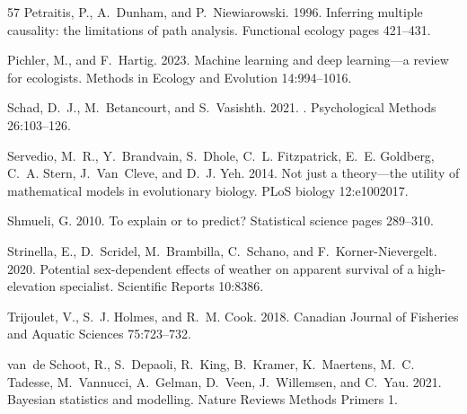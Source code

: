 \documentclass[11pt]{article}
\begin{document}
\begin{thebibliography}{57}
Petraitis, P., A.~Dunham, and P.~Niewiarowski. 1996.
\newblock Inferring multiple causality: the limitations of path analysis.
\newblock Functional ecology pages 421--431.

Pichler, M., and F.~Hartig. 2023.
\newblock Machine learning and deep learning---a review for ecologists.
\newblock Methods in Ecology and Evolution 14:994--1016.

Schad, D.~J., M.~Betancourt, and S.~Vasishth. 2021.
.
\newblock Psychological Methods 26:103--126.

Servedio, M.~R., Y.~Brandvain, S.~Dhole, C.~L. Fitzpatrick, E.~E. Goldberg,
  C.~A. Stern, J.~Van~Cleve, and D.~J. Yeh. 2014.
\newblock Not just a theory---the utility of mathematical models in
  evolutionary biology.
\newblock PLoS biology 12:e1002017.

Shmueli, G. 2010.
\newblock To explain or to predict?
\newblock Statistical science pages 289--310.

Strinella, E., D.~Scridel, M.~Brambilla, C.~Schano, and F.~Korner-Nievergelt.
  2020.
\newblock Potential sex-dependent effects of weather on apparent survival of a
  high-elevation specialist.
\newblock Scientific Reports 10:8386.

Trijoulet, V., S.~J. Holmes, and R.~M. Cook. 2018.
\newblock Canadian Journal of Fisheries and Aquatic Sciences 75:723--732.

van~de Schoot, R., S.~Depaoli, R.~King, B.~Kramer, K.~Maertens, M.~C. Tadesse,
  M.~Vannucci, A.~Gelman, D.~Veen, J.~Willemsen, and C.~Yau. 2021.
\newblock Bayesian statistics and modelling.
\newblock Nature Reviews Methods Primers 1.


\end{thebibliography}
\end{document}
